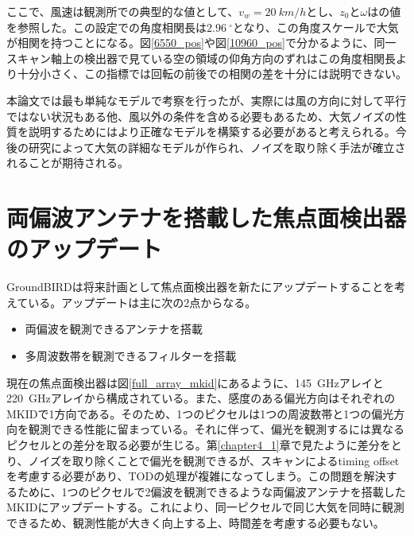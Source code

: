 ここで、風速は観測所での典型的な値として、$v_{w}=\SI{20}{km/h}$とし、$z_{0}$と$\omega$は\cite{nishinomiya}の値を参照した。この設定での角度相関長は$\SI{2.96}{^{\circ}}$となり、この角度スケールで大気が相関を持つことになる。図\ref{6550_pos}や図\ref{10960_pos}で分かるように、同一スキャン軸上の検出器で見ている空の領域の仰角方向のずれはこの角度相関長より十分小さく、この指標では回転の前後での相関の差を十分には説明できない。

本論文では最も単純なモデルで考察を行ったが、実際には風の方向に対して平行ではない状況もある他、風以外の条件を含める必要もあるため、大気ノイズの性質を説明するためにはより正確なモデルを構築する必要があると考えられる。今後の研究によって大気の詳細なモデルが作られ、ノイズを取り除く手法が確立されることが期待される。
\section{両偏波アンテナを搭載した焦点面検出器のアップデート}
GroundBIRDは将来計画として焦点面検出器を新たにアップデートすることを考えている。アップデートは主に次の2点からなる。
\begin{itemize}
  \item 両偏波を観測できるアンテナを搭載
  \item 多周波数帯を観測できるフィルターを搭載
\end{itemize}
現在の焦点面検出器は図\ref{full_array_mkid}にあるように、\SI{145}{GHz}アレイと\SI{220}{GHz}アレイから構成されている。また、感度のある偏光方向はそれぞれのMKIDで1方向である。そのため、1つのピクセルは1つの周波数帯と1つの偏光方向を観測できる性能に留まっている。それに伴って、偏光を観測するには異なるピクセルとの差分を取る必要が生じる。第\ref{chapter4_1}章で見たように差分をとり、ノイズを取り除くことで偏光を観測できるが、スキャンによるtiming offsetを考慮する必要があり、TODの処理が複雑になってしまう。この問題を解決するために、1つのピクセルで2偏波を観測できるような両偏波アンテナを搭載したMKIDにアップデートする。これにより、同一ピクセルで同じ大気を同時に観測できるため、観測性能が大きく向上する上、時間差を考慮する必要もない。

